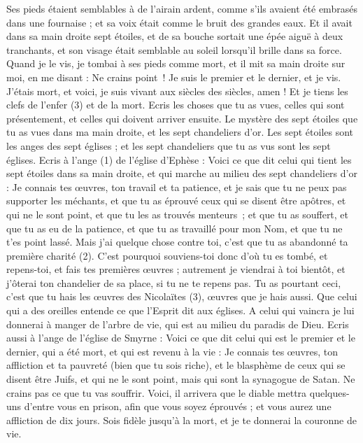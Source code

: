 \begin{multicols}{2}
Ses pieds étaient semblables à de l'airain ardent, comme s'ils avaient été embrasés dans une fournaise ; et sa voix était comme le bruit des grandes eaux.
Et il avait dans sa main droite sept étoiles, et de sa bouche sortait une épée aiguë à deux tranchants, et son visage était semblable au soleil lorsqu’il brille dans sa force.
Quand je le vis, je tombai à ses pieds comme mort, et il mit sa main droite sur moi, en me disant : Ne crains point ! Je suis le premier et le dernier,
et je vis. J’étais mort, et voici, je suis vivant aux siècles des siècles, amen ! Et je tiens les clefs de l'enfer (3) et de la mort.
Ecris les choses que tu as vues, celles qui sont présentement, et celles qui doivent arriver ensuite.
Le mystère des sept étoiles que tu as vues dans ma main droite, et les sept chandeliers d'or. Les sept étoiles sont les anges des sept églises ; et les sept chandeliers que tu as vus sont les sept églises.
\VerseOne{}Ecris à l'ange (1) de l'église d'Ephèse : Voici ce que dit celui qui tient les sept étoiles dans sa main droite, et qui marche au milieu des sept chandeliers d'or :
Je connais tes œuvres, ton travail et ta patience, et je sais que tu ne peux pas supporter les méchants, et que tu as éprouvé ceux qui se disent être apôtres, et qui ne le sont point, et que tu les as trouvés menteurs ;
et que tu as souffert, et que tu as eu de la patience, et que tu as travaillé pour mon Nom, et que tu ne t'es point lassé.
Mais j'ai quelque chose contre toi, c'est que tu as abandonné ta première charité (2).
C'est pourquoi souviens-toi donc d'où tu es tombé, et repens-toi, et fais tes premières œuvres ; autrement je viendrai à toi bientôt, et j'ôterai ton chandelier de sa place, si tu ne te repens pas.
Tu as pourtant ceci, c’est que tu hais les œuvres des Nicolaïtes (3), œuvres que je hais aussi.
Que celui qui a des oreilles entende ce que l'Esprit dit aux églises. A celui qui vaincra je lui donnerai à manger de l'arbre de vie, qui est au milieu du paradis de Dieu.
Ecris aussi à l'ange de l'église de Smyrne : Voici ce que dit celui qui est le premier et le dernier, qui a été mort, et qui est revenu à la vie :
Je connais tes œuvres, ton affliction et ta pauvreté (bien que tu sois riche), et le blasphème de ceux qui se disent être Juifs, et qui ne le sont point, mais qui sont la synagogue de Satan.
Ne crains pas ce que tu vas souffrir. Voici, il arrivera que le diable mettra quelques-uns d’entre vous en prison, afin que vous soyez éprouvés ; et vous aurez une affliction de dix jours. Sois fidèle jusqu’à la mort, et je te donnerai la couronne de vie.

\end{multicols}
